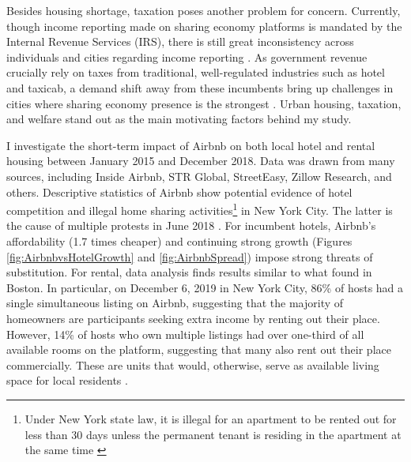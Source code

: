 \documentclass[12pt]{article}
\begin{document}
		\par
		Besides housing shortage, taxation poses another problem for concern. Currently, though income reporting made on sharing economy platforms is mandated by the Internal Revenue Services (IRS), there is still great inconsistency across individuals and cities regarding income reporting \citep{cestnick2018navigating}. As government revenue crucially rely on taxes from traditional, well-regulated industries such as hotel and taxicab, a demand shift away from these incumbents bring up challenges in cities where sharing economy presence is the strongest \citep{zervas2017rise}. Urban housing, taxation, and welfare stand out as the main motivating factors behind my study.
		
		\par
		I investigate the short-term impact of Airbnb on both local hotel and rental housing between January 2015 and December 2018. Data was drawn from many sources, including Inside Airbnb, STR Global, StreetEasy, Zillow Research, and others. Descriptive statistics of Airbnb show potential evidence of hotel competition and illegal home sharing activities\footnote{Under New York state law, it is illegal for an apartment to be rented out for less than 30 days unless the permanent tenant is residing in the apartment at the same time \citep{weiser2019judge}} in New York City. The latter is the cause of multiple protests in June 2018 \citep{greenberg2018new}. For incumbent hotels, Airbnb's affordability (1.7 times cheaper) and continuing strong growth (Figures \ref{fig:AirbnbvsHotelGrowth} and \ref{fig:AirbnbSpread}) impose strong threats of substitution. For rental, data analysis finds results similar to what \citet{horn2017home} found in Boston. In particular, on December 6, 2019 in New York City, 86\% of hosts had a single simultaneous listing on Airbnb, suggesting that the majority of homeowners are participants seeking extra income by renting out their place. However, 14\% of hosts who own multiple listings had over one-third of all available rooms on the platform, suggesting that many also rent out their place commercially. These are units that would, otherwise, serve as available living space for local residents \citep{horn2017home}.
		
\end{document}
